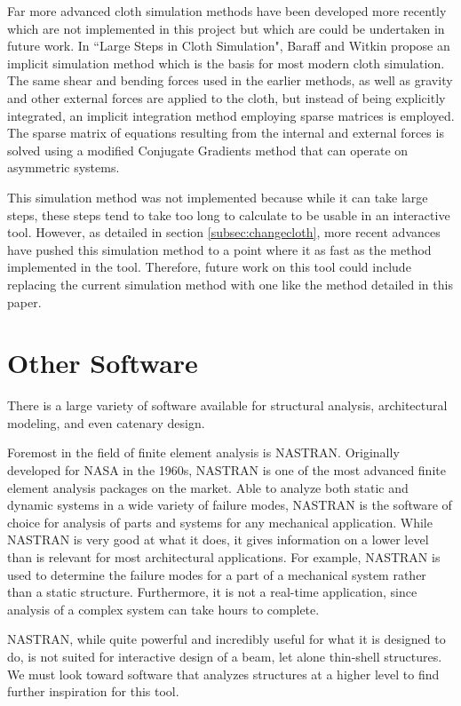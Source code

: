 \documentclass{thesis}
\begin{document}
Far more advanced cloth simulation methods have been developed more recently which are not implemented in
this project but which are could be undertaken in future work.  In ``Large Steps in Cloth Simulation"\cite{baraff98largesteps},
Baraff and Witkin propose an implicit simulation method which is the basis for most modern cloth simulation.
The same shear and bending forces used in the earlier methods, as well as gravity and other external forces
are applied to the cloth, but instead of being explicitly integrated, an implicit integration method employing
sparse matrices is employed.  The sparse matrix of equations resulting from the internal and external forces
is solved using a modified Conjugate Gradients method that can operate on asymmetric systems.

This simulation method was not implemented because while it can take large steps, these steps tend to take
too long to calculate to be usable in an interactive tool.  However, as detailed in section \ref{subsec:changecloth},
more recent advances have pushed this simulation method to a point where it as fast as the method implemented in
the tool.  Therefore, future work on this tool could include replacing the current simulation method with one
like the method detailed in this paper.

\section{Other Software}
There is a large variety of software available for structural analysis, architectural modeling, and even
catenary design.

Foremost in the field of finite element analysis is NASTRAN\cite{NASTRAN}.  Originally developed for NASA in
the 1960s, NASTRAN is one of the most advanced finite element analysis packages on the market.  Able to
analyze both static and dynamic systems in a wide variety of failure modes, NASTRAN is the software
of choice for analysis of parts and systems for any mechanical application.  While NASTRAN is very good
at what it does, it gives information on a lower level than is relevant for most architectural applications.
For example, NASTRAN is used to determine the failure modes for a part of a mechanical system rather than
a static structure.  Furthermore, it is not a real-time application, since analysis of a complex system can take
hours to complete.

NASTRAN, while quite powerful and incredibly useful for what it is designed to do, is not suited for interactive
design of a beam, let alone thin-shell structures.  We must look toward software that analyzes structures at a
higher level to find further inspiration for this tool.
\end{document}
